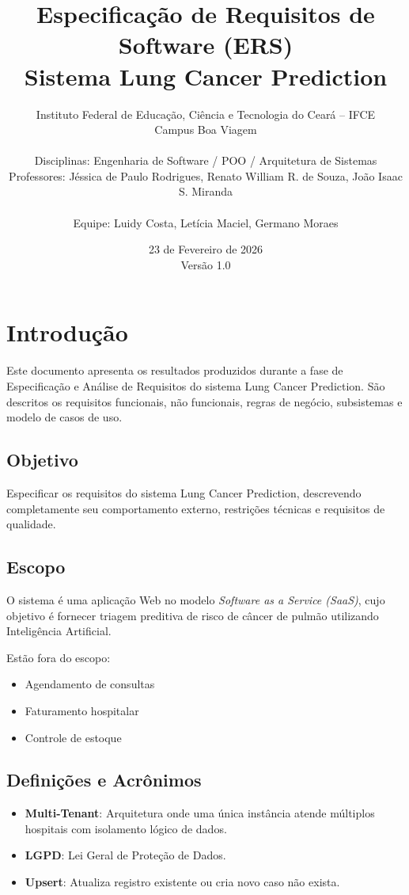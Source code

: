\documentclass[12pt,a4paper]{article}
\title{\textbf{Especificação de Requisitos de Software (ERS)}\\
Sistema Lung Cancer Prediction}
\author{
Instituto Federal de Educação, Ciência e Tecnologia do Ceará -- IFCE\\
Campus Boa Viagem\\
\\
Disciplinas: Engenharia de Software / POO / Arquitetura de Sistemas\\
Professores: Jéssica de Paulo Rodrigues, Renato William R. de Souza, João Isaac S. Miranda\\
\\
Equipe: Luidy Costa, Letícia Maciel, Germano Moraes
}
\date{23 de Fevereiro de 2026 \\ Versão 1.0}
\begin{document}
\maketitle
\thispagestyle{empty}
\newpage

\tableofcontents
\newpage

\section{Introdução}

Este documento apresenta os resultados produzidos durante a fase de Especificação e Análise de Requisitos do sistema Lung Cancer Prediction. São descritos os requisitos funcionais, não funcionais, regras de negócio, subsistemas e modelo de casos de uso.

\subsection{Objetivo}

Especificar os requisitos do sistema Lung Cancer Prediction, descrevendo completamente seu comportamento externo, restrições técnicas e requisitos de qualidade.

\subsection{Escopo}

O sistema é uma aplicação Web no modelo \textit{Software as a Service (SaaS)}, cujo objetivo é fornecer triagem preditiva de risco de câncer de pulmão utilizando Inteligência Artificial.

Estão fora do escopo:
\begin{itemize}
    \item Agendamento de consultas
    \item Faturamento hospitalar
    \item Controle de estoque
\end{itemize}

\subsection{Definições e Acrônimos}

\begin{itemize}
    \item \textbf{Multi-Tenant}: Arquitetura onde uma única instância atende múltiplos hospitais com isolamento lógico de dados.
    \item \textbf{LGPD}: Lei Geral de Proteção de Dados.
    \item \textbf{Upsert}: Atualiza registro existente ou cria novo caso não exista.
\end{itemize}
\end{document}
